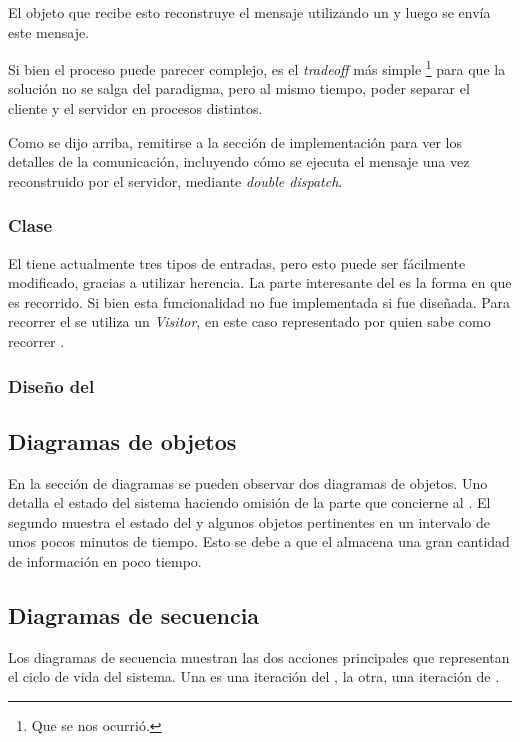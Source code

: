          El objeto que recibe esto reconstruye el mensaje utilizando un \constructorMensaje{}
          y luego se env\'ia este mensaje.

          Si bien el proceso puede parecer complejo, es el \textit{tradeoff} m\'as simple
          \footnote{Que se nos ocurri\'o.} para que la soluci\'on no se salga del paradigma,
          pero al mismo tiempo, poder separar el cliente y el servidor en procesos distintos.

          Como se dijo arriba, remitirse a la secci\'on de implementaci\'on para ver
          los detalles de la comunicaci\'on, incluyendo c\'omo se ejecuta el mensaje
          una vez reconstruido por el servidor, mediante \textit{double dispatch}.

      \subsubsection{Clase \historial{}}
          El \historial{} tiene actualmente tres tipos de entradas, pero esto puede
          ser f\'acilmente modificado, gracias a utilizar herencia.
          La parte interesante del \historial{} es la forma en que es recorrido.
          Si bien esta funcionalidad no fue implementada si fue dise\~nada.
          Para recorrer el \historial{} se utiliza un \textit{Visitor}, en este caso
          representado por \recopilador{} quien sabe como recorrer \historial{}.

      \subsubsection{Dise\~no del \planmaestro{}}


  \subsection{Diagramas de objetos}
    En la secci\'on de diagramas se pueden observar dos diagramas de objetos.
    Uno detalla el estado del sistema haciendo omisi\'on de la parte que concierne
    al \historial{}.
    El segundo muestra el estado del \historial{} y algunos objetos pertinentes
    en un intervalo de unos pocos minutos de tiempo. Esto se debe a que el
    \historial{} almacena una gran cantidad de informaci\'on en poco tiempo.

  \subsection{Diagramas de secuencia}
    Los diagramas de secuencia muestran las dos acciones principales que
    representan el ciclo de vida del sistema.
    Una es una iteraci\'on del \decisiones{}, la otra, una iteraci\'on de \condiciones{}.
